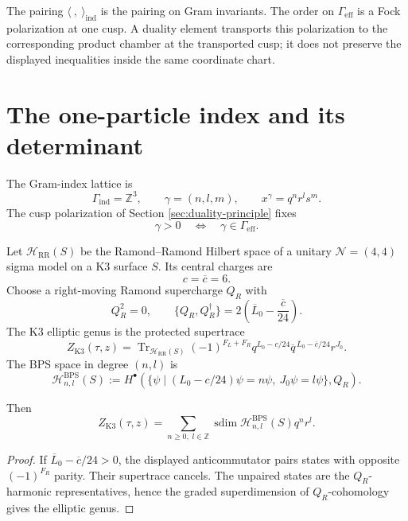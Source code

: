 \documentclass[11pt]{memoir}
\newcommand{\Z}{\mathbb{Z}} \newcommand{\C}{\mathbb{C}}
\newcommand{\sdim}{\operatorname{sdim}}
\begin{document}
\begin{remark}
The pairing $\langle\ ,\ \rangle_{\mathrm{ind}}$ is the pairing on
Gram invariants.  The order on $\Gamma_{\mathrm{eff}}$ is a Fock
polarization at one cusp.  A duality element transports this
polarization to the corresponding product chamber at the transported
cusp; it does not preserve the displayed inequalities inside the same
coordinate chart.
\end{remark}

\section{The one-particle index and its determinant}

The Gram-index lattice is
$$\Gamma_{\mathrm{ind}}=\Z^3,\qquad
\gamma=(n,l,m),\qquad x^\gamma=q^nr^ls^m.$$
The cusp polarization of Section \ref{sec:duality-principle} fixes
$$\gamma>0\quad\Longleftrightarrow\quad
\gamma\in\Gamma_{\mathrm{eff}}.$$

\begin{definition}
Let $\mathcal H_{\mathrm{RR}}(S)$ be the Ramond--Ramond Hilbert space of
a unitary $\mathcal N=(4,4)$ sigma model on a K3 surface $S$.  Its
central charges are
$$c=\overline c=6.$$
Choose a right-moving Ramond supercharge $Q_R$ with
$$Q_R^2=0,\qquad
\{Q_R,Q_R^\dagger\}=
2\left(\overline L_0-\frac{\overline c}{24}\right).$$
The K3 elliptic genus is the protected supertrace
$$
Z_{\mathrm{K3}}(\tau,z)=
\operatorname{Tr}_{\mathcal H_{\mathrm{RR}}(S)}
(-1)^{F_L+F_R}q^{L_0-c/24}
\overline q^{\,\overline L_0-\overline c/24}r^{J_0}.
$$
The BPS space in degree $(n,l)$ is
$$
\mathcal H^{\mathrm{BPS}}_{n,l}(S):=
H^\bullet\!\left(
\{\psi\mid (L_0-c/24)\psi=n\psi,\ J_0\psi=l\psi\},Q_R
\right).
$$
\end{definition}

\begin{lemma}
Then
$$
Z_{\mathrm{K3}}(\tau,z)=
\sum_{n\geq0,\;l\in\Z}
\sdim\mathcal H^{\mathrm{BPS}}_{n,l}(S)q^nr^l.
$$
\end{lemma}

\begin{proof}
If $\overline L_0-\overline c/24>0$, the displayed anticommutator pairs
states with opposite $(-1)^{F_R}$ parity.  Their supertrace cancels.
The unpaired states are the $Q_R$-harmonic representatives, hence the
graded superdimension of $Q_R$-cohomology gives the elliptic genus.
\end{proof}
\end{document}
